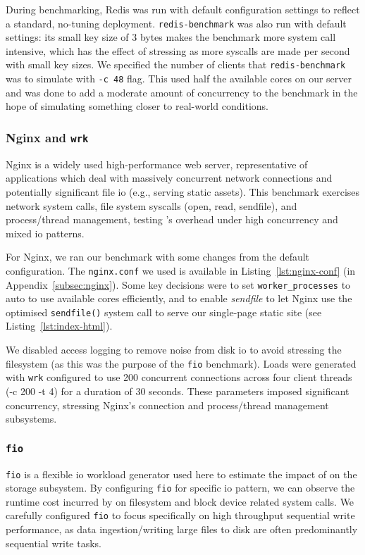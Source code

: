 During benchmarking, Redis was run with default configuration settings to
reflect a standard, no-tuning deployment. \texttt{redis-benchmark} was also run
with default settings: its small key size of 3 bytes makes the benchmark more
system call intensive, which has the effect of stressing \af as more syscalls are
made per second with small key sizes. We specified the number of clients that
\texttt{redis-benchmark} was to simulate with \texttt{-c 48} flag. This used
half the available cores on our server and was done to add a moderate amount of
concurrency to the benchmark in the hope of simulating something closer to
real-world conditions.

\subsubsection{Nginx and \texttt{wrk}}\label{subsubsec:nginx-just}

Nginx is a widely used high-performance web server, representative of applications
which deal with massively concurrent network connections and potentially
significant file \ac{io} (e.g., serving static assets). This benchmark exercises
network system calls, file system syscalls (open, read, sendfile),
and process/thread management, testing \af's overhead under high concurrency
and mixed \ac{io} patterns.

For Nginx, we ran our benchmark with some changes from the
default configuration. The \texttt{nginx.conf} we used is available in
Listing~\ref{lst:nginx-conf} (in Appendix~\ref{subsec:nginx}). Some key 
decisions were to set \texttt{worker\_processes} to auto to use available cores 
efficiently, and to enable \textit{sendfile} to let Nginx use the optimised 
\texttt{sendfile()} system call to serve our single-page static site (see 
Listing~\ref{lst:index-html}).

We disabled access logging to remove noise from disk \ac{io} to avoid stressing
the filesystem (as this was the purpose of the \texttt{fio} benchmark).
Loads were generated with \texttt{wrk} configured to use 200 concurrent
connections across four client threads (-c 200 -t 4) for a duration of 30
seconds. These parameters imposed significant concurrency, stressing Nginx's
connection and process/thread management subsystems.

\subsubsection{\texttt{fio}}\label{subsubsec:fio-just}
\texttt{fio}  is a flexible \ac{io} workload generator used here to estimate
the impact of \af on the storage subsystem. By configuring \texttt{fio} for
specific \ac{io} pattern, we can observe the runtime cost incurred by \af on
filesystem and block device related system calls. We carefully configured
\texttt{fio} to focus specifically on high throughput sequential write
performance, as data ingestion/writing large files to disk are often 
predominantly sequential write tasks.

